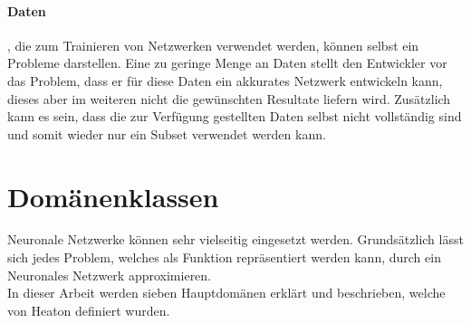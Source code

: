 \paragraph{Daten}, die zum Trainieren von Netzwerken verwendet werden, können selbst ein Probleme darstellen.
Eine zu geringe Menge an Daten stellt den Entwickler vor das Problem, dass er für diese Daten ein akkurates Netzwerk entwickeln kann, dieses aber im weiteren nicht die gewünschten Resultate liefern wird.
Zusätzlich kann es sein, dass die zur Verfügung gestellten Daten selbst nicht vollständig sind und somit wieder nur ein Subset verwendet werden kann. \\


\section{Domänenklassen}
\label{sec:Domänenklassen}

Neuronale Netzwerke können sehr vielseitig eingesetzt werden. 
Grundsätzlich lässt sich jedes Problem, welches als Funktion repräsentiert werden kann, durch ein Neuronales Netzwerk approximieren. \\

\noindent
In dieser Arbeit werden sieben Hauptdomänen erklärt und beschrieben, welche von Heaton \cite{AI3} definiert wurden. %

